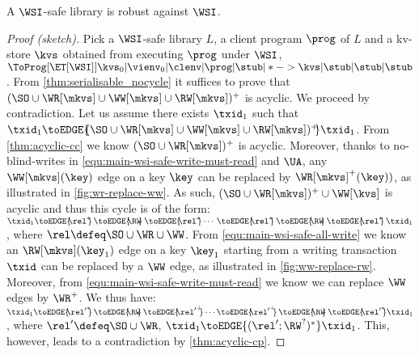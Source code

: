 


\begin{theorem}
 \label{thm:main-wsi-robust}
    A \(\WSI\)-safe library is robust against \(\WSI\).   
\end{theorem}
\SpaceBelowDef
%

%
\begin{proof}[Proof (sketch)]
Pick a \(\WSI\)-safe  library \( L \), a client program \( \prog \) of  $L$ and a kv-store \( \kvs \) obtained from executing \( \prog \) under $\WSI$,
\ie \( \ToProg[{\ET[\WSI]}]{\kvs_0 | \vienv_0 | \clenv | \prog | \stub | * -> \kvs | \stub | \stub | \stub }\).
From \cref{thm:serialisable_nocycle} it suffices to prove that $(\SO \cup \WR[\mkvs] \cup \WW[\mkvs] \cup \RW[\mkvs])^{+}$ is acyclic.
We proceed by contradiction.
Let us assume there exists $\txid_1$ such that $\txid_1 \toEDGE{\!\!(\SO \cup \WR[\mkvs] \cup \WW[\mkvs] \cup \RW[\mkvs])^{+}\!\!} \txid_1$. 
From \cref{thm:acyclic-cc} we know \( (\SO \cup \WR[\mkvs])^{+} \) is acyclic.
Moreover, thanks to no-blind-writes in \eqref{equ:main-wsi-safe-write-must-read} and \( \UA \),
any \( \WW[\mkvs](\key)\) edge on a key \( \key \) can be replaced by \( \WR[\mkvs]^{+}(\key) ) \), 
as illustrated in \cref{fig:wr-replace-ww}.
As such, \( (\SO \cup \WR[\mkvs])^{+} \cup \WW[\kvs]\) is acyclic and thus this cycle is of the form:
\(
    \txid_1 \toEDGE{\!\!\rel^*\!\!} \,\toEDGE{\!\!\RW\!\!}\, \toEDGE{\!\!\rel^*\!\!} \cdots \,\toEDGE{\!\!\rel^*\!\!}\, \toEDGE{\!\!\RW\!\!}\, \toEDGE{\!\!\rel^*\!\!}\, \txid_1
\),
where \( \rel \defeq \SO \cup \WR \cup \WW \).
From \eqref{equ:main-wsi-safe-all-write} we know 
an \( \RW[\mkvs](\key_1) \) edge on a key \( \key_1 \) starting from 
a writing transaction \( \txid \) can be replaced by a \( \WW \) edge,
as illustrated in \cref{fig:ww-replace-rw}.
Moreover, from \eqref{equ:main-wsi-safe-write-must-read} we know we can replace \( \WW \) edges by \( \WR^+ \).
We thus have:
\(
    \txid_1 \toEDGE{\!\!{\rel'}^*\!\!} \,\toEDGE{\!\!\RW\!\!}\, \toEDGE{\!\!{\rel'}^+\!\!} \cdots \toEDGE{\!\!{\rel'}^+\!\!} \,\toEDGE{\!\!\RW\!\!} \,\toEDGE{\!\!{\rel'}^*\!\!} \txid_1
\),
where \( \rel' \defeq \SO \cup \WR  \),
\ie \( \txid_1 \toEDGE{( \rel'; \RW^? )^* } \txid_1 \).
This, however, leads to a contradiction by \cref{thm:acyclic-cp}.
\renewcommand{\qed}{}
\end{proof}

